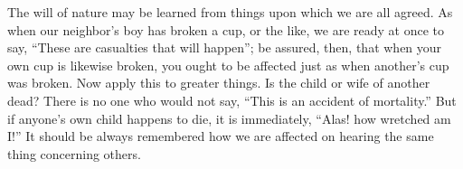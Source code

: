 The will of nature may be learned from things upon which we are all
agreed. As when our neighbor's boy has broken a cup, or the like, we are
ready at once to say, ``These are casualties that will happen''; be
assured, then, that when your own cup is likewise broken, you ought to be
affected just as when another's cup was broken. Now apply this to greater
things. Is the child or wife of another dead? There is no one who would
not say, ``This is an accident of mortality.'' But if anyone's own child
happens to die, it is immediately, ``Alas! how wretched am I!'' It should
be always remembered how we are affected on hearing the same thing 
concerning others.
